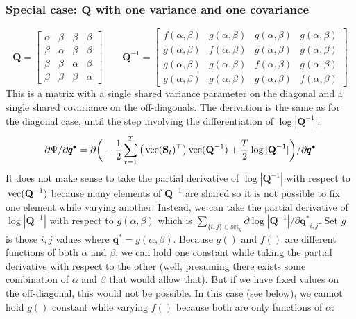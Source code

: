 \documentclass[]{article}
\def\QQ{\mbox{$\mathbf Q$}}	 \def\qq{\mbox{$\mathbf q$}} \def\Qb{\mbox{$\mathbf G$}}  \def\Qm{\mathbb{Q}}
\def\SS{\mbox{$\mathbf S$}}
\def\vec{\,\textup{\textrm{vec}}}
\begin{document}
\subsubsection{Special case: $\QQ$ with one variance and one covariance}
\begin{equation*}
\QQ=
\begin{bmatrix}
\alpha&\beta&\beta&\beta\\
\beta&\alpha&\beta&\beta\\
\beta&\beta&\alpha&\beta\\
\beta&\beta&\beta&\alpha
\end{bmatrix}\quad\quad
\QQ^{-1}=
\begin{bmatrix}
f(\alpha,\beta)&g(\alpha,\beta)&g(\alpha,\beta)&g(\alpha,\beta)\\
g(\alpha,\beta)&f(\alpha,\beta)&g(\alpha,\beta)&g(\alpha,\beta)\\
g(\alpha,\beta)&g(\alpha,\beta)&f(\alpha,\beta)&g(\alpha,\beta)\\
g(\alpha,\beta)&g(\alpha,\beta)&g(\alpha,\beta)&f(\alpha,\beta)
\end{bmatrix}
\end{equation*}
This is a matrix with a single shared variance parameter on the diagonal and a single shared covariance on the off-diagonals.  The derivation is the same as for the diagonal case, until the step involving the differentiation of $\log|\QQ^{-1}|$:
\begin{equation}\label{eq:Q.eqvarcov1}
\begin{split}
&\partial\Psi/\partial\pmb{q^{*}} = 
 \partial\bigg(-\frac{1}{2} \sum_{t=1}^T\big(\vec(\SS_t)^\top\big)\vec(\QQ^{-1})
+ \frac{T}{2}\log |\QQ^{-1}|\bigg)/\partial\pmb{q^{*}} \\
\end{split}
\end{equation}
It does not make sense to take the partial derivative of $\log |\QQ^{-1}|$ with respect to $\vec(\QQ^{-1})$ because many elements of $\QQ^{-1}$ are shared so it is not possible to fix one element while varying another.  Instead, we can take the partial derivative of $\log |\QQ^{-1}|$ with respect to $g(\alpha,\beta)$ which is $\sum_{\{i,j\}\in \text{set}_g}\partial\log|\QQ^{-1}|/\partial\pmb{q^{*}}_{i,j}$.  Set $g$ is those $i,j$ values where $\pmb{q^{*}}=g(\alpha,\beta)$.  Because $g()$ and $f()$ are different functions of both $\alpha$ and $\beta$, we can hold one constant while taking the partial derivative with respect to the other (well, presuming there exists some combination of $\alpha$ and $\beta$ that would allow that).  But if we have fixed values on the off-diagonal, this would not be possible.  In this case (see below), we cannot hold $g()$ constant while varying $f()$ because both are only functions of $\alpha$:
\end{document}
